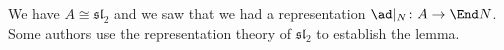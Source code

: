 We have $A \cong \mathfrak{sl}_2$ and we saw that we had a representation
$\ad|_N\colon A\to \End N$. Some authors use the representation theory
of $\mathfrak{sl}_2$ to establish the lemma.

